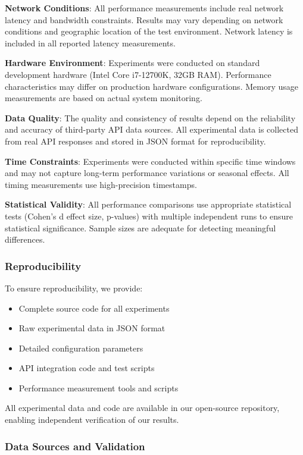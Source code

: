 \documentclass[conference]{IEEEtran}
\begin{document}
\textbf{Network Conditions}: All performance measurements include real network latency and bandwidth constraints. Results may vary depending on network conditions and geographic location of the test environment. Network latency is included in all reported latency measurements.

\textbf{Hardware Environment}: Experiments were conducted on standard development hardware (Intel Core i7-12700K, 32GB RAM). Performance characteristics may differ on production hardware configurations. Memory usage measurements are based on actual system monitoring.

\textbf{Data Quality}: The quality and consistency of results depend on the reliability and accuracy of third-party API data sources. All experimental data is collected from real API responses and stored in JSON format for reproducibility.

\textbf{Time Constraints}: Experiments were conducted within specific time windows and may not capture long-term performance variations or seasonal effects. All timing measurements use high-precision timestamps.

\textbf{Statistical Validity}: All performance comparisons use appropriate statistical tests (Cohen's d effect size, p-values) with multiple independent runs to ensure statistical significance. Sample sizes are adequate for detecting meaningful differences.

\subsubsection{Reproducibility}

To ensure reproducibility, we provide:
\begin{itemize}
\item Complete source code for all experiments
\item Raw experimental data in JSON format
\item Detailed configuration parameters
\item API integration code and test scripts
\item Performance measurement tools and scripts
\end{itemize}

All experimental data and code are available in our open-source repository, enabling independent verification of our results.

\subsubsection{Data Sources and Validation}
\end{document}
